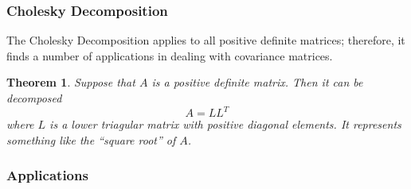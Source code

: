 \documentclass[12pt]{article}
\numberwithin{equation}{section} %
\theoremstyle{plain}
\newtheorem{thm}{Theorem}[section]
\theoremstyle{definition}
\theoremstyle{remark}
\begin{document}
\subsubsection{Cholesky Decomposition}

The Cholesky Decomposition applies to all positive definite matrices;
therefore, it finds a number of applications in dealing with covariance
matrices.

\begin{thm}
Suppose that $A$ is a positive definite matrix. Then it
can be decomposed
\begin{equation}
  A = L L^T
\end{equation}
where $L$ is a lower triagular matrix with positive diagonal elements.
It represents something like the ``square root'' of $A$.
\end{thm}

\subsubsection{Applications}
\end{document}
